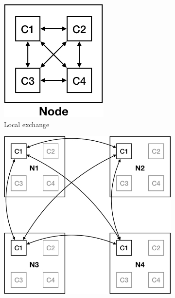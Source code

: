 \documentclass{report}
\begin{document}
\begin{figure}
	\begin{center}
		\begin{subfigure}{0.44\linewidth}
			\centerline{\includegraphics[width=1.0\columnwidth]{local}}
			\caption{Local exchange \label{fig:local_exchange}}
		\end{subfigure}%
		\hspace{1em}%
		\begin{subfigure}{0.53\linewidth}
			\centerline{\includegraphics[width=1.0\columnwidth]{remote}}

\end{subfigure}
\end{center}
\end{figure}
\end{document}
